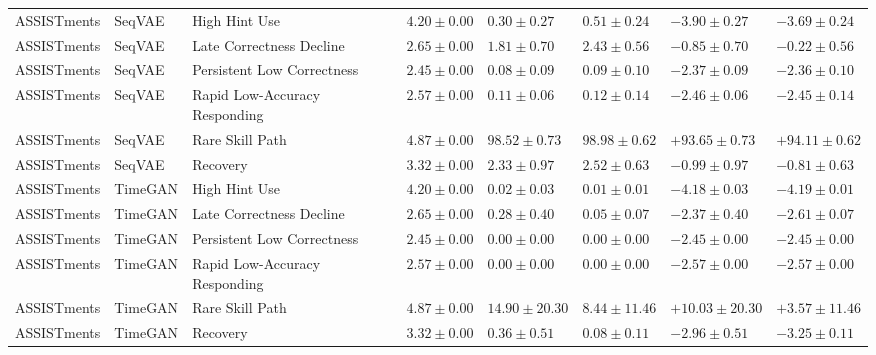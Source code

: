 \begin{longtable}{@{}p{2.0cm}p{1.8cm}p{3.1cm}p{2.0cm}p{2.25cm}p{2.25cm}p{2.35cm}p{2.35cm}@{}}
ASSISTments & SeqVAE & High Hint Use & $4.20 \mathbin{\pm} 0.00$ & $0.30 \mathbin{\pm} 0.27$ & $0.51 \mathbin{\pm} 0.24$ & $-3.90 \mathbin{\pm} 0.27$ & $-3.69 \mathbin{\pm} 0.24$ \\
ASSISTments & SeqVAE & Late Correctness Decline & $2.65 \mathbin{\pm} 0.00$ & $1.81 \mathbin{\pm} 0.70$ & $2.43 \mathbin{\pm} 0.56$ & $-0.85 \mathbin{\pm} 0.70$ & $-0.22 \mathbin{\pm} 0.56$ \\
ASSISTments & SeqVAE & Persistent Low Correctness & $2.45 \mathbin{\pm} 0.00$ & $0.08 \mathbin{\pm} 0.09$ & $0.09 \mathbin{\pm} 0.10$ & $-2.37 \mathbin{\pm} 0.09$ & $-2.36 \mathbin{\pm} 0.10$ \\
ASSISTments & SeqVAE & Rapid Low-Accuracy Responding & $2.57 \mathbin{\pm} 0.00$ & $0.11 \mathbin{\pm} 0.06$ & $0.12 \mathbin{\pm} 0.14$ & $-2.46 \mathbin{\pm} 0.06$ & $-2.45 \mathbin{\pm} 0.14$ \\
ASSISTments & SeqVAE & Rare Skill Path & $4.87 \mathbin{\pm} 0.00$ & $98.52 \mathbin{\pm} 0.73$ & $98.98 \mathbin{\pm} 0.62$ & $+93.65 \mathbin{\pm} 0.73$ & $+94.11 \mathbin{\pm} 0.62$ \\
ASSISTments & SeqVAE & Recovery & $3.32 \mathbin{\pm} 0.00$ & $2.33 \mathbin{\pm} 0.97$ & $2.52 \mathbin{\pm} 0.63$ & $-0.99 \mathbin{\pm} 0.97$ & $-0.81 \mathbin{\pm} 0.63$ \\
ASSISTments & TimeGAN & High Hint Use & $4.20 \mathbin{\pm} 0.00$ & $0.02 \mathbin{\pm} 0.03$ & $0.01 \mathbin{\pm} 0.01$ & $-4.18 \mathbin{\pm} 0.03$ & $-4.19 \mathbin{\pm} 0.01$ \\
ASSISTments & TimeGAN & Late Correctness Decline & $2.65 \mathbin{\pm} 0.00$ & $0.28 \mathbin{\pm} 0.40$ & $0.05 \mathbin{\pm} 0.07$ & $-2.37 \mathbin{\pm} 0.40$ & $-2.61 \mathbin{\pm} 0.07$ \\
ASSISTments & TimeGAN & Persistent Low Correctness & $2.45 \mathbin{\pm} 0.00$ & $0.00 \mathbin{\pm} 0.00$ & $0.00 \mathbin{\pm} 0.00$ & $-2.45 \mathbin{\pm} 0.00$ & $-2.45 \mathbin{\pm} 0.00$ \\
ASSISTments & TimeGAN & Rapid Low-Accuracy Responding & $2.57 \mathbin{\pm} 0.00$ & $0.00 \mathbin{\pm} 0.00$ & $0.00 \mathbin{\pm} 0.00$ & $-2.57 \mathbin{\pm} 0.00$ & $-2.57 \mathbin{\pm} 0.00$ \\
ASSISTments & TimeGAN & Rare Skill Path & $4.87 \mathbin{\pm} 0.00$ & $14.90 \mathbin{\pm} 20.30$ & $8.44 \mathbin{\pm} 11.46$ & $+10.03 \mathbin{\pm} 20.30$ & $+3.57 \mathbin{\pm} 11.46$ \\
ASSISTments & TimeGAN & Recovery & $3.32 \mathbin{\pm} 0.00$ & $0.36 \mathbin{\pm} 0.51$ & $0.08 \mathbin{\pm} 0.11$ & $-2.96 \mathbin{\pm} 0.51$ & $-3.25 \mathbin{\pm} 0.11$ \\

\end{longtable}
